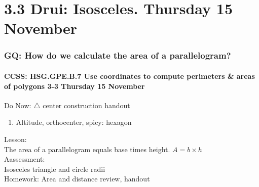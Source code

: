 \documentclass{beamer}
\begin{document}
  \section{3.3 Drui: Isosceles. Thursday 15 November}
    \frame
    {
      \frametitle{GQ: How do we calculate the area of a parallelogram?}
      \framesubtitle{CCSS: HSG.GPE.B.7 Use coordinates to compute perimeters \& areas of polygons  \alert{3-3 Thursday 15 November}}

      \begin{block}{Do Now: $\triangle$ center construction handout}
        \begin{enumerate}
            \item Altitude, orthocenter, spicy: hexagon
        \end{enumerate}
      \end{block}
      Lesson: \\
      The area of a parallelogram equals base times height. $A=b \times h$ \\[0.2cm]
      Aassessment: \\
      Isosceles triangle  and circle radii\\[0.2cm]
      Homework: Area and distance review, handout
    }
\end{document}
